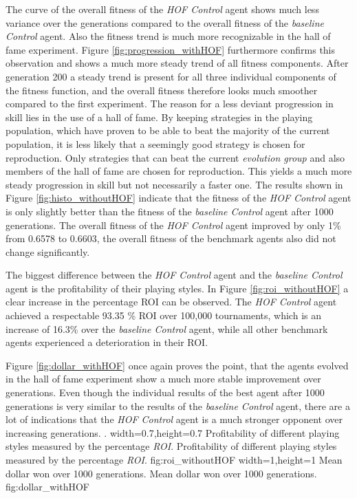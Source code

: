 The curve of the overall fitness of the \textit{HOF Control} agent shows much less variance over the generations compared to the overall fitness of the \textit{baseline Control} agent. Also the fitness trend is much more recognizable in the hall of fame experiment. Figure \ref{fig:progression_withHOF} furthermore confirms this observation and shows a much more steady trend of all fitness components. After generation 200 a steady trend is present for all three individual components of the fitness function, and the overall fitness therefore looks much smoother compared to the first experiment. The reason for a less deviant progression in skill lies in the use of a hall of fame. By keeping strategies in the playing population, which have proven to be able to beat the majority of the current population, it is less likely that a seemingly good strategy is chosen for reproduction. Only strategies that can beat the current \textit{evolution group} and also members of the hall of fame are chosen for reproduction. This yields a much more steady progression in skill but not necessarily a faster one. The results shown in Figure \ref{fig:histo_withoutHOF} indicate that the fitness of the \textit{HOF Control} agent is only slightly better than the fitness of the \textit{baseline Control} agent after 1000 generations. The overall fitness of the \textit{HOF Control} agent improved by only 1\% from 0.6578 to 0.6603, the overall fitness of the benchmark agents also did not change significantly.\par
The biggest difference between the \textit{HOF Control} agent and the \textit{baseline Control} agent is the profitability of their playing styles. In Figure \ref{fig:roi_withoutHOF} a clear increase in the percentage ROI can be observed. The \textit{HOF Control} agent achieved a respectable 93.35 \% ROI over 100,000 tournaments, which is an increase of 16.3\% over the \textit{baseline Control} agent, while all other benchmark agents experienced a deterioration in their ROI.\par 
Figure \ref{fig:dollar_withHOF} once again proves the point, that the agents evolved in the hall of fame experiment show a much more stable improvement over generations. Even though the individual results of the best agent after 1000 generations is very similar to the results of the \textit{baseline Control} agent, there are a lot of indications that the \textit{HOF Control} agent is a much stronger opponent over increasing generations. .
  {width=0.7\textwidth,height=0.7\textheight}%
  {Profitability of different playing styles measured by the percentage \textit{ROI}.}%
  {Profitability of different playing styles measured by the percentage \textit{ROI}.}%
  {fig:roi_withoutHOF}%
  {width=1\textwidth,height=1\textheight}%
  {Mean dollar won over 1000 generations.}%
  {Mean dollar won over 1000 generations.}%
  {fig:dollar_withHOF}%
\pagebreak
